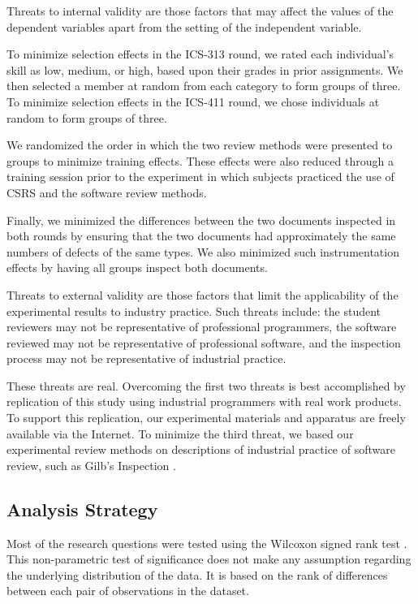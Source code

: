 Threats to internal validity are those factors that may affect the values
of the dependent variables apart from the setting of the independent
variable.

To minimize selection effects in the ICS-313 round, we rated each
individual's skill as low, medium, or high, based upon their grades in
prior assignments. We then selected a member at random from each category
to form groups of three. To minimize selection effects in the ICS-411
round, we chose individuals at random to form groups of three.

We randomized the order in which the two review methods were
presented to groups to minimize training effects. These effects  were
also reduced through a training session prior to the experiment in which
subjects practiced the use of CSRS and the software review methods.

Finally, we minimized the differences between the two documents inspected
in both rounds by ensuring that the two documents had approximately the
same numbers of defects of the same types. We also minimized
such instrumentation effects by having all groups inspect both documents.

Threats to external validity are those factors that limit the applicability
of the experimental results to industry practice. Such threats include: the
student reviewers may not be representative of professional programmers,
the software reviewed may not be representative of professional software,
and the inspection process may not be representative of industrial
practice.

These threats are real.  Overcoming the first two threats is best
accomplished by replication of this study using industrial programmers with
real work products. To support this replication, our experimental materials
and apparatus are freely available via the Internet.   To minimize the
third threat, we based our experimental review methods on descriptions of 
industrial practice of software review, such as Gilb's Inspection 
\cite{Gilb93}.

\subsection{Analysis Strategy}

Most of the research questions were tested using the Wilcoxon signed rank
test \cite{Ferguson89}. This non-parametric test of significance does not
make any assumption regarding the underlying distribution of the data.  It
is based on the rank of differences between each pair of observations in
the dataset.

